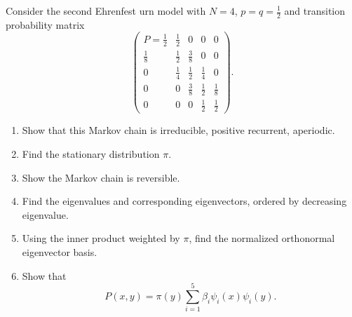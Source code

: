 \documentclass[12pt]{article}
\begin{document}
\begin{exercise}
    Consider the second Ehrenfest urn model with \( N=4 \), \( p = q =
    \frac{1}{2} \) and transition probability matrix
    \[
        \begin{pmatrix}
            P = \frac{1}{2} & \frac{1}{2} & 0 & 0 & 0\\
            \frac{1}{8} & \frac{1}{2} & \frac{3}{8} & 0 & 0\\
            0 & \frac{1}{4} & \frac{1}{2} & \frac{1}{4} & 0\\
            0 & 0 & \frac{3}{8} & \frac{1}{2} & \frac{1}{8}\\
            0 & 0 & 0 & \frac{1}{2} & \frac{1}{2}
        \end{pmatrix}
        .
    \]
    \begin{enumerate}[label=(\alph*)]
    \item
        Show that this Markov chain is irreducible, positive recurrent,
        aperiodic.
    \item
        Find the stationary distribution \( \pi \).
    \item
        Show the Markov chain is reversible.
    \item
        Find the eigenvalues and corresponding eigenvectors, ordered by
        decreasing eigenvalue.
    \item
        Using the inner product weighted by \( \pi \), find the
        normalized orthonormal eigenvector basis.
    \item
        Show that
        \[
            P(x,y) = \pi(y) \sum\limits_{i=1}^{5} \beta_i \psi_i(x) \psi_i
            (y).
        \]
\end{enumerate}
\end{exercise}
\end{document}
